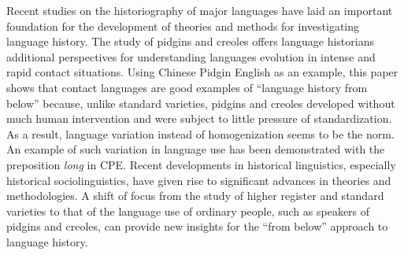 \documentclass[output=paper]{langsci/langscibook}
\begin{document}
Recent studies on the historiography of major languages have laid an important foundation for the development of theories and methods for investigating language history. The study of pidgins and creoles offers language historians additional perspectives for understanding languages evolution in intense and rapid contact situations. Using Chinese Pidgin English as an example, this paper shows that contact languages are good examples of “language history from below” because, unlike standard varieties, pidgins and creoles developed without much human intervention and were subject to little pressure of standardization. As a result, language variation instead of homogenization seems to be the norm. An example of such variation in language use has been demonstrated with the preposition \textit{long} in CPE. Recent developments in historical linguistics, especially historical sociolinguistics, have given rise to significant advances in theories and methodologies. A shift of focus from the study of higher register and standard varieties to that of the language use of ordinary people, such as speakers of pidgins and creoles, can provide new insights for the “from below” approach to language history.




{\sloppy\printbibliography[heading=subbibliography,notkeyword=this]}
\end{document}
